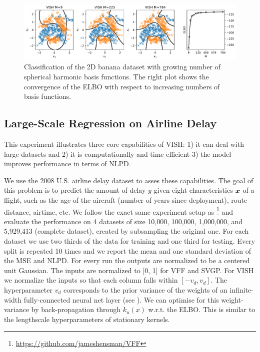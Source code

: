\begin{figure}[tbh]
    \centering
    \includegraphics[width=\textwidth]{banana}
    \caption{Classification of the 2D banana dataset with growing number of spherical harmonic basis functions. The right plot shows the convergence of the ELBO with respect to increasing numbers of basis functions.\label{fig:banana}}
\end{figure}



\subsection{Large-Scale Regression on Airline Delay}
 
\begin{table}[tb]
\centering
\resizebox{\textwidth}{!}{ }
\caption{Predictive mean squared errors (MSEs), negative log predictive densities (NLPDs) and wall-clock time in seconds with one standard deviation based on 10 random splits on the airline arrival delays experiment. Total dataset size is given by $N$ and in each split we randomly select 2/3 and 1/3 for training and testing.}
\label{tab:airline}
\end{table}


This experiment illustrates three core capabilities of VISH: 1) it can deal with large datasets and 2) it is computationally and time efficient 3) the model improves performance in terms of NLPD.

We use the 2008 U.S. airline delay dataset to asses these capabilities. The goal of this problem is to predict the amount of delay $y$ given eight characteristics $\bm{x}$ of a flight, such as 
the age of the aircraft (number of years since deployment), route distance, airtime, etc. We follow the exact same experiment setup as \citet{hensman2017variational}\footnote{\url{https://github.com/jameshensman/VFF}} and evaluate the performance on 4 datasets of size 10,000, 100,000, 1,000,000, and 5,929,413 (complete dataset), created by subsampling the original one. For each dataset we use two thirds of the data for training and one third for testing. Every split is repeated 10 times and we report the mean and one standard deviation of the MSE and NLPD. For every run the outputs are normalized to be a centered unit Gaussian. The inputs are normalized to [0, 1] for VFF and SVGP. For VISH we normalize the inputs so that each column falls within $[-v_d, v_d]$. The hyperparameter $v_d$ corresponds to the prior variance of the weights of an infinite-width fully-connected neural net layer (see \citet{cho2009kernel}). We can optimise for this weight-variance by back-propagation through $k_u(x)$ w.r.t. the ELBO. This is similar to the lengthscale hyperparameters of stationary kernels.

